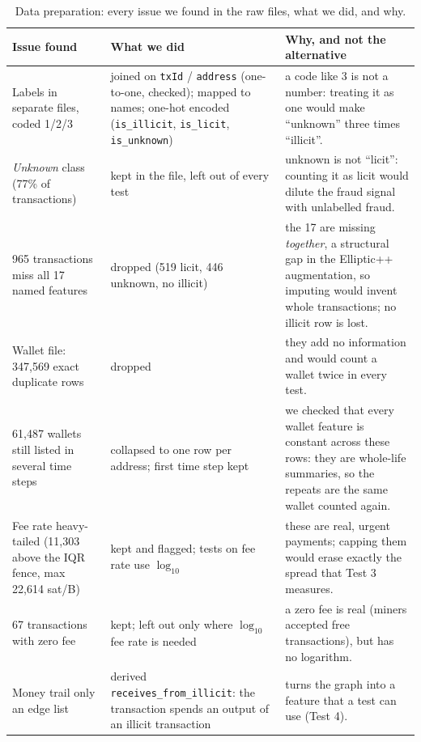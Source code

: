 \documentclass[10pt,a4paper,twocolumn]{article}
\newcommand{\code}[1]{\texttt{#1}}
\begin{document}
\begin{table}[!t]
\caption{Data preparation: every issue we found in the raw files, what we did, and why.}
\label{tab:prep}
{\footnotesize
\begin{tabularx}{\textwidth}{@{}L{3.6cm} L{5.4cm} Y@{}}
\toprule
\textbf{Issue found} & \textbf{What we did} & \textbf{Why, and not the alternative} \\
\midrule
Labels in separate files, coded 1/2/3
 & joined on \code{txId} / \code{address} (one-to-one, checked); mapped to names; one-hot
   encoded (\code{is\_illicit}, \code{is\_licit}, \code{is\_unknown})
 & a code like 3 is not a number: treating it as one would make ``unknown'' three times
   ``illicit''. \\
\emph{Unknown} class (77\% of transactions)
 & kept in the file, left out of every test
 & unknown is not ``licit'': counting it as licit would dilute the fraud signal with
   unlabelled fraud. \\
965 transactions miss all 17 named features
 & dropped (519 licit, 446 unknown, no illicit)
 & the 17 are missing \emph{together}, a structural gap in the Elliptic++ augmentation, so
   imputing would invent whole transactions; no illicit row is lost. \\
Wallet file: 347{,}569 exact duplicate rows
 & dropped
 & they add no information and would count a wallet twice in every test. \\
61{,}487 wallets still listed in several time steps
 & collapsed to one row per address; first time step kept
 & we checked that every wallet feature is constant across these rows: they are whole-life
   summaries, so the repeats are the same wallet counted again. \\
Fee rate heavy-tailed (11{,}303 above the IQR fence, max 22{,}614 sat/B)
 & kept and flagged; tests on fee rate use $\log_{10}$
 & these are real, urgent payments; capping them would erase exactly the spread that Test 3
   measures. \\
67 transactions with zero fee
 & kept; left out only where $\log_{10}$ fee rate is needed
 & a zero fee is real (miners accepted free transactions), but has no logarithm. \\
Money trail only an edge list
 & derived \code{receives\_}\allowbreak\code{from\_}\allowbreak\code{illicit}: the transaction spends an output of an illicit
   transaction
 & turns the graph into a feature that a test can use (Test 4). \\
\bottomrule
\end{tabularx}}
\end{table}
\end{document}
